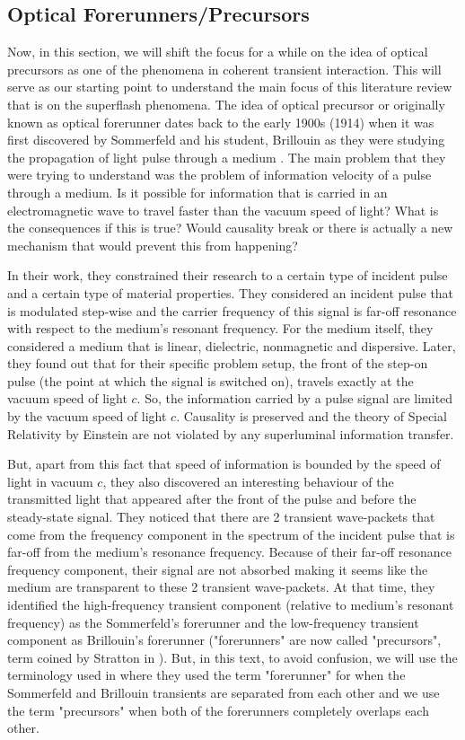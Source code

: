 \subsection{Optical Forerunners/Precursors}\label{precursor}
Now, in this section, we will shift the focus for a while on the idea of optical precursors as one of the phenomena in coherent transient interaction. This will serve as our starting point to understand the main focus of this literature review that is on the superflash phenomena. The idea of optical precursor or originally known as optical forerunner dates back to the early 1900s (1914) when it was first discovered by Sommerfeld and his student, Brillouin as they were studying the propagation of light pulse through a medium \cite{Sommerfeld1914, Brillouin1914}. The main problem that they were trying to understand was the problem of information velocity of a pulse through a medium. Is it possible for information that is carried in an electromagnetic wave to travel faster than the vacuum speed of light? What is the consequences if this is true? Would causality break or there is actually a new mechanism that would prevent this from happening?

In their work, they constrained their research to a certain type of incident pulse and a certain type of material properties. They considered an incident pulse that is modulated step-wise and the carrier frequency of this signal is far-off resonance with respect to the medium's resonant frequency. For the medium itself, they considered a medium that is linear, dielectric, nonmagnetic and dispersive. Later, they found out that for their specific problem setup, the front of the step-on pulse (the point at which the signal is switched on), travels exactly at the vacuum speed of light $c$. So, the information carried by a pulse signal are limited by the vacuum speed of light $c$. Causality is preserved and the theory of Special Relativity by Einstein are not violated by any superluminal information transfer.

But, apart from this fact that speed of information is bounded by the speed of light in vacuum $c$, they also discovered an interesting behaviour of the transmitted light that appeared after the front of the pulse and before the steady-state signal. They noticed that there are 2 transient wave-packets that come from the frequency component in the spectrum of the incident pulse that is far-off from the medium's resonance frequency. Because of their far-off resonance frequency component, their signal are not absorbed making it seems like the medium are transparent to these 2 transient wave-packets. At that time, they identified the high-frequency transient component (relative to medium's resonant frequency) as the Sommerfeld's forerunner and the low-frequency transient component as Brillouin's forerunner ("forerunners" are now called "precursors", term coined by Stratton in ). But, in this text, to avoid confusion, we will use the terminology used in  where they used the term "forerunner" for when the Sommerfeld and Brillouin transients are separated from each other and we use the term "precursors" when both of the forerunners completely overlaps each other.

